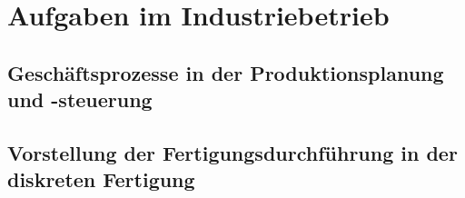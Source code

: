 \section{Aufgaben im Industriebetrieb}

\subsection{Geschäftsprozesse in der Produktionsplanung und -steuerung}

\subsection{Vorstellung der Fertigungsdurchführung in der diskreten Fertigung}

